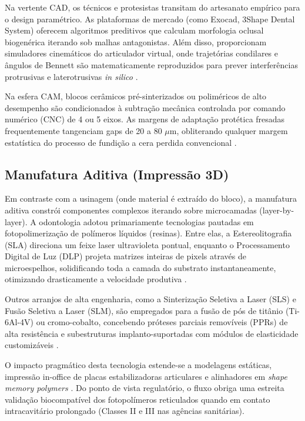 Na vertente CAD, os técnicos e protesistas transitam do artesanato empírico para o design paramétrico. As plataformas de mercado (como Exocad, 3Shape Dental System) oferecem algoritmos preditivos que calculam morfologia oclusal biogenérica iterando sob malhas antagonistas. Além disso, proporcionam simuladores cinemáticos do articulador virtual, onde trajetórias condilares e ângulos de Bennett são matematicamente reproduzidos para prever interferências protrusivas e laterotrusivas \textit{in silico} \cite{roy2025applications}.

Na esfera CAM, blocos cerâmicos pré-sinterizados ou poliméricos de alto desempenho são condicionados à subtração mecânica controlada por comando numérico (CNC) de 4 ou 5 eixos. As margens de adaptação protética fresadas frequentemente tangenciam gaps de 20 a 80 $\mu$m, obliterando qualquer margem estatística do processo de fundição a cera perdida convencional \cite{li2025impacts}.

\subsection{Manufatura Aditiva (Impressão 3D)}
\label{subsec:impressao3d}

Em contraste com a usinagem (onde material é extraído do bloco), a manufatura aditiva constrói componentes complexos iterando sobre microcamadas (layer-by-layer). A odontologia adotou primariamente tecnologias pautadas em fotopolimerização de polímeros líquidos (resinas). Entre elas, a Estereolitografia (SLA) direciona um feixe laser ultravioleta pontual, enquanto o Processamento Digital de Luz (DLP) projeta matrizes inteiras de pixels através de microespelhos, solidificando toda a camada do substrato instantaneamente, otimizando drasticamente a velocidade produtiva \cite{zhang2024recursive}.

Outros arranjos de alta engenharia, como a Sinterização Seletiva a Laser (SLS) e Fusão Seletiva a Laser (SLM), são empregados para a fusão de pós de titânio (Ti-6Al-4V) ou cromo-cobalto, concebendo próteses parciais removíveis (PPRs) de alta resistência e subestruturas implanto-suportadas com módulos de elasticidade customizáveis \cite{alshadidi2024surface}.

O impacto pragmático desta tecnologia estende-se a modelagens estáticas, impressão in-office de placas estabilizadoras articulares e alinhadores em \textit{shape memory polymers} \cite{li2024aligner}. Do ponto de vista regulatório, o fluxo obriga uma estreita validação biocompatível dos fotopolímeros reticulados quando em contato intracavitário prolongado (Classes II e III nas agências sanitárias).

